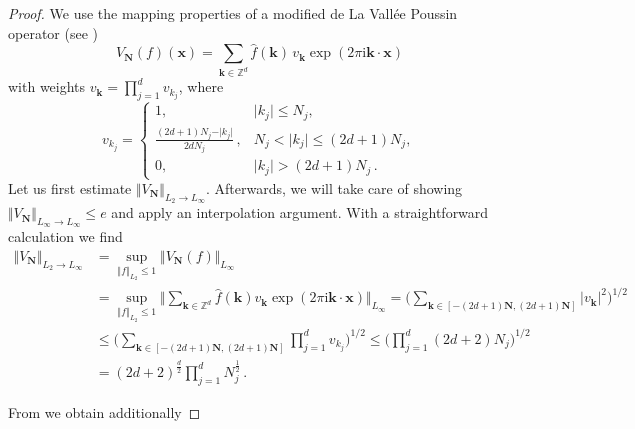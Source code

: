 \documentclass[11pt,reqno]{article}
\numberwithin{equation}{section}
\theoremstyle{definition}
\theoremstyle{plain}
\newcommand{\zz}{\ensuremath{\mathbb{Z}}}
\newcommand{\Z}{{\ensuremath{\zz}^d}}
\newcommand{\bk}{\ensuremath{\mathbf k}}
\newcommand{\bN}{\ensuremath{\mathbf N}}
\newcommand{\bx}{\ensuremath{\mathbf x}}
\newcommand{\be}{\begin{equation}}
\newcommand{\ee}{\end{equation}}
\begin{document}
\begin{proof}
We use the mapping properties of a modified de La Vall{\'e}e Poussin operator (see \cite[Sect.\ 3.1]{JUV23})  
\be
V_\bN(f)(\bx) =  \sum_{\bk \in \Z} \hat{f}(\bk) \, v_\bk \exp(2 \pi \mathrm{i}  \bk\cdot \bx)
\ee
with weights \( v_\bk = \prod_{j = 1}^d v_{k_j}\), where
\be
v_{k_j} = 
\begin{cases}
1, & \vert k_j\vert \leq N_j , \\
\frac{(2d+1)N_j - \vert k_j\vert}{2dN_j} \,, & N_j <\vert k_j\vert \leq (2d+1)N_j , \\
0 , &\vert k_j\vert > (2d+1)N_j\,.
\end{cases}
\ee
  \noindent
Let us first estimate $\Vert V_\bN \Vert_{L_2 \to L_\infty}$. Afterwards, we will take care of showing \(\Vert V_\bN \Vert_{L_\infty \to L_\infty} \leq e\) and apply an interpolation argument. With a straightforward calculation we find 
\begin{align}
\Vert V_\bN \Vert_{L_2 \to L_\infty} & = \sup_{\Vert f \Vert_{L_2} \leq 1} \Vert V_\bN(f) \Vert_{L_\infty} \\
& = \sup_{\Vert f \Vert_{L_2} \leq 1} \Big\Vert \sum_{\bk \in \Z} \hat{f}(\bk) v_\bk \exp(2 \pi \mathrm{i} \bk\cdot \bx) \Big\Vert_{L_\infty}
 =\Big(\sum_{\bk \in [-(2d+1)\bN,(2d+1)\bN]} |v_{\bk}|^2\Big)^{1/2} \\
& \leq \Big(\sum_{\bk \in [-(2d+1)\bN,(2d+1)\bN]}  \prod_{j = 1}^d v_{k_j} \Big)^{1/2}  \leq \Big(\prod_{j = 1}^d (2d+2) N_j \Big)^{1/2} \\
& = (2d+2)^{\frac{d}{2}} \prod_{j = 1}^d N_j^{\frac{1}{2}}\,.
\end{align}




 \noindent 
From \cite[Sect.\ 3.1]{JUV23} we obtain additionally
 


\end{proof}
\end{document}
